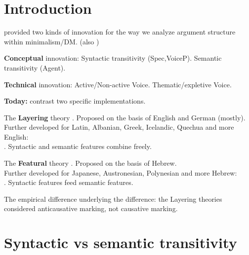 \section{Introduction} \label{sec:intro}
\ex \cite{schaefer08} provided two kinds of innovation for the way we analyze argument structure within minimalism/DM.
	(also \citealt{alexiadouetal06,layering15})
\xe

\pex\label{florian-conce}\textbf{Conceptual} innovation:
	\a Syntactic transitivity (Spec,VoiceP).
	\a Semantic transitivity (Agent).
\xe

\pex\label{florian-tech}\textbf{Technical} innovation:
	\a Active/Non-active Voice.
	\a Thematic/expletive Voice.
\xe

\textbf{Today:} contrast two specific implementations.

\pex\label{intro-layer}The \textbf{Layering} theory \citep{schaefer08,layering15}.
	\a Proposed on the basis of English and German (mostly).\\
		Further developed for Latin, Albanian, Greek, Icelandic, Quechua and more English:\\ \cite{embick04,kallulli13,spathasetal15,wood15springer,schaefervivanco16,myler17oup,schaefer17oup}.
	\a Syntactic and semantic features combine freely.
\xe

\pex\label{intro-feat}The \textbf{Featural} theory \citep{kastner16phd}.
	\a Proposed on the basis of Hebrew.\\
		Further developed for Japanese, Austronesian, Polynesian and more Hebrew:\\ \cite{kastner17gjgl,kastner18tlr,kastner18nllt,oseki17nyu,nie17}.
	\a Syntactic features feed semantic features.
\xe

\ex The empirical difference underlying the difference: the Layering theories considered anticausative marking, not causative marking.
\xe

\newpage
\section{Syntactic vs semantic transitivity}
